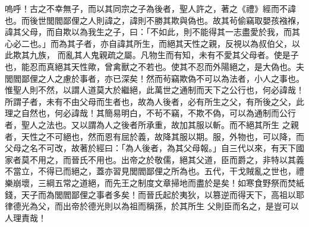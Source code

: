 \begin{pinyinscope}
 嗚呼！古之不幸無子，而以其同宗之子為後者，聖人許之，著之《禮》經而不諱也。而後世閭閻鄙俚之人則諱之，諱則不勝其欺與偽也。故其茍偷竊取嬰孩襁褓，諱其父母，而自欺以為我生之子，曰：「不如此，則不能得其一志盡愛於我，而其心必二也。」而為其子者，亦自諱其所生，而絕其天性之親，反視以為叔伯父，以此欺其九族，
 而亂其人鬼親疏之屬。凡物生而有知，未有不愛其父母者。使是子也，能忍而真絕其天性歟，曾禽獸之不若也。使其不忍而外陽絕之，是大偽也。夫閭閻鄙俚之人之慮於事者，亦已深矣！然而茍竊欺偽不可以為法者，小人之事也。惟聖人則不然，以謂人道莫大於繼絕，此萬世之通制而天下之公行也，何必諱哉！所謂子者，未有不由父母而生者也，故為人後者，必有所生之父，有所後之父，此理之自然也，何必諱哉！其簡易明白，不茍不竊，不欺不偽，可以為通制而公行者，聖人之法也。又以謂為人之後者所承重，故加其服以斬。而不絕其所生
 之親者，天性之不可絕也，然而恩有屈於義，故降其服以期。服，外物也，可以降，而父母之名不可改，故著於經曰：「為人後者，為其父母報。」自三代以來，有天下國家者莫不用之，而晉氏不用也。出帝之於敬儒，絕其父道，臣而爵之，非特以其義不當立，不得已而絕之，蓋亦習見閭閻鄙俚之所為也。五代，干戈賊亂之世也，禮樂崩壞，三綱五常之道絕，而先王之制度文章掃地而盡於是矣！如寒食野祭而焚紙錢，天子而為閭閻鄙俚之事者多矣！而晉氏起於夷狄，以篡逆而得天下，高祖以耶律德光為父，而出帝於德光則以為祖而稱孫，於其所生
 父則臣而名之，是豈可以人理責哉！



\end{pinyinscope}